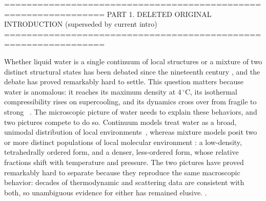 
\iffalse

================================================================
 PART 1.  DELETED ORIGINAL INTRODUCTION (superseded by current intro)
================================================================

Whether liquid water is a single continuum of local structures  or a mixture of two distinct structural states has been debated since the nineteenth century \cite{whiting-1883, rontgen-1892} , and the debate has proved remarkably hard to settle. This question matters because water is anomalous: it reaches its maximum density at $4\,^\circ$C, its
isothermal compressibility rises on supercooling, and its dynamics cross
over from fragile to strong ~\cite{gallo_water_2016}.  The microscopic picture of water needs to explain these behaviors, and two pictures compete to do so. Continuum models treat water as a broad, unimodal distribution of local environments~\cite{eisenberg_structure_2005}, whereas mixture models\cite{whiting-1883,rontgen-1892,wernet-2004, huang-2009, russo_understanding_2014}  posit two or more distinct populations of local molecular environment : a low-density, tetrahedrally ordered form, and a denser, less-ordered form, whose relative fractions shift with temperature and pressure. The two pictures have proved remarkably hard to separate because they reproduce the same macroscopic behavior: decades of thermodynamic and scattering data are consistent with both, so unambiguous evidence for either has remained elusive. \cite{gallo_water_2016, handle_supercooled_2017}. 


